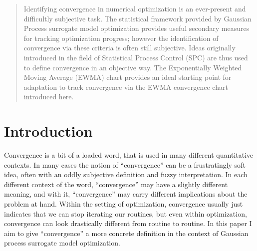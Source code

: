 \documentclass[12pt]{article}
\begin{document}
%
%
\begin{abstract}
Identifying convergence in numerical optimization is an ever-present and difficultly subjective task. 
The statistical framework provided by Gaussian Process surrogate model optimization provides useful secondary measures for tracking optimization progress; however the identification of convergence via these criteria is often still subjective. %
Ideas originally introduced in the field of Statistical Process Control (SPC) are thus used to define convergence in an objective way. 
The Exponentially Weighted Moving Average (EWMA) chart provides an ideal starting point for adaptation to track convergence via the EWMA convergence chart introduced here.




% 
% 
% 
% 
%                 
%                 
%                 
%                 
\end{abstract}
\doublespacing
%
%


%
\section{Introduction}
	Convergence is a bit of a loaded word, that is used in many different quantitative contexts.
	In many cases the notion of ``convergence'' can be a frustratingly soft idea, often with an oddly subjective definition and fuzzy interpretation.  
	In each different context of the word, ``convergence'' may have a slightly different meaning, and with it, ``convergence'' may carry different implications about the problem at hand.
	Within the setting of optimization, convergence usually just indicates that we can stop iterating our routines, but even within optimization, convergence can look drastically different from routine to routine.
	In this paper I aim to give ``convergence'' a more concrete definition in the context of Gaussian process surrogate model optimization.
	
\end{document}
